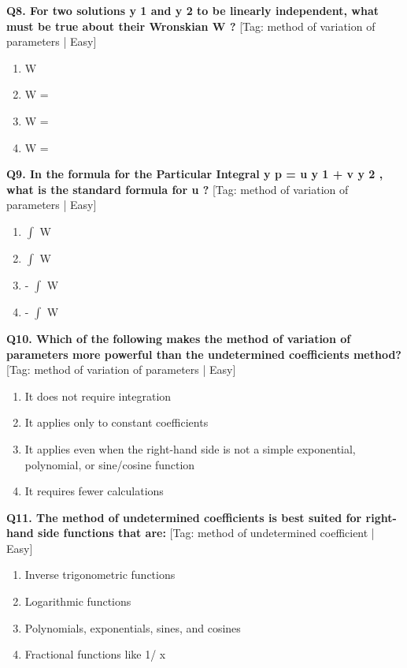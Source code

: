 \noindent\textbf{Q8. For two solutions y 1 and y 2 to be linearly independent, what must be true about their Wronskian W ?} \hfill [Tag: method of variation of parameters | Easy]
\begin{enumerate}[label=(\alph*),topsep=2pt,itemsep=1pt,partopsep=0pt,parsep=0pt]
    \item {{W }}
    \item {{W =}}
    \item {{W =}}
    \item {{W =}}
\end{enumerate}
\vspace{2mm}

\noindent\textbf{Q9. In the formula for the Particular Integral y p = u y 1 + v y 2 , what is the standard formula for u ?} \hfill [Tag: method of variation of parameters | Easy]
\begin{enumerate}[label=(\alph*),topsep=2pt,itemsep=1pt,partopsep=0pt,parsep=0pt]
    \item {{$\int$ W}}
    \item {{$\int$ W}}
    \item {{- $\int$ W}}
    \item {{- $\int$ W}}
\end{enumerate}
\vspace{2mm}

\noindent\textbf{Q10. Which of the following makes the method of variation of parameters more powerful than the undetermined coefficients method?} \hfill [Tag: method of variation of parameters | Easy]
\begin{enumerate}[label=(\alph*),topsep=2pt,itemsep=1pt,partopsep=0pt,parsep=0pt]
    \item {{It does not require integration}}
    \item {{It applies only to constant coefficients}}
    \item {{It applies even when the right-hand side is not a simple exponential, polynomial, or sine/cosine function}}
    \item {{It requires fewer calculations}}
\end{enumerate}
\vspace{2mm}

\noindent\textbf{Q11. The method of undetermined coefficients is best suited for right-hand side functions that are:} \hfill [Tag: method of undetermined coefficient | Easy]
\begin{enumerate}[label=(\alph*),topsep=2pt,itemsep=1pt,partopsep=0pt,parsep=0pt]
    \item {{Inverse trigonometric functions}}
    \item {{Logarithmic functions}}
    \item {{Polynomials, exponentials, sines, and cosines}}
    \item {{Fractional functions like 1/ x}}
\end{enumerate}
\vspace{2mm}

